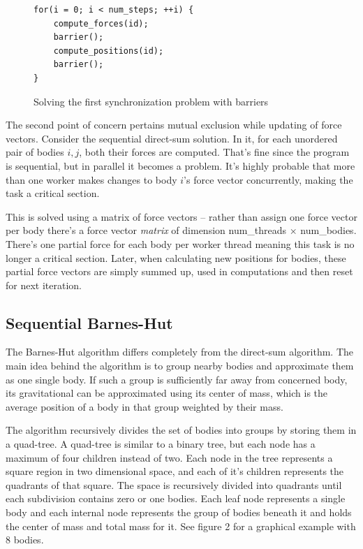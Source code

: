\documentclass[10pt,a4paper]{article}
\begin{document}
\begin{figure}[h!]
\begin{verbatim}
for(i = 0; i < num_steps; ++i) {
    compute_forces(id);
    barrier();   
    compute_positions(id);
    barrier();
}
\end{verbatim}
\caption{Solving the first synchronization problem with barriers}
\end{figure}
The second point of concern pertains mutual exclusion while updating of force vectors. Consider the sequential direct-sum solution. In it, for each unordered pair of bodies $i, j$, both their forces are computed. That's fine since the program is sequential, but in parallel it becomes a problem. It's highly probable that more than one worker makes changes to body $i$'s force vector concurrently, making the task a critical section. 

This is solved using a matrix of force vectors -- rather than assign one force vector per body there's a force vector \textit{matrix} of dimension num\_threads $\times$ num\_bodies. There's one partial force for each body per worker thread meaning this task is no longer a critical section. Later, when calculating new positions for bodies, these partial force vectors are simply summed up, used in computations and then reset for next iteration.
\subsection{Sequential Barnes-Hut}
The Barnes-Hut algorithm differs completely from the direct-sum algorithm. The main idea behind the algorithm is to group nearby bodies and approximate them as one single body. If such a group is sufficiently far away from concerned body, its gravitational can be approximated using its center of mass, which is the average position of a body in that group weighted by their mass\cite{princeton}.

The algorithm recursively divides the set of bodies into groups by storing them in a quad-tree. A quad-tree is similar to a binary tree, but each node has a maximum of four children instead of two. Each node in the tree represents a square region in two dimensional space, and each of it's children represents the quadrants of that square. The space is recursively divided into quadrants until each subdivision contains zero or one bodies. Each leaf node represents a single body and each internal node represents the group of bodies beneath it and holds the center of mass and total mass for it. See figure 2 for a graphical example with 8 bodies.
\end{document}
